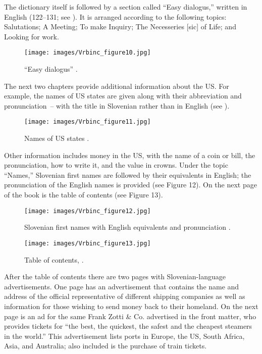 \documentclass[output=paper,colorlinks,citecolor=brown,arabicfont,chinesefont]{langscibook}
\begin{document}
The dictionary itself is followed by a section called “Easy dialogus,” written in English (122–131; see ). It is arranged according to the following topics: Salutations; A Meeting; To make Inquiry; The Necesseries [sic] of Life; and Looking for work.

\begin{figure}
\texttt{[image: images/Vrbinc\_figure10.jpg]}
\caption{“Easy dialogus” \citep[127]{Kubelka1904}.}
\label{vrbinc:fig10}
\end{figure}

The next two chapters provide additional information about the US. For example, the names of US states are given along with their abbreviation and pronunciation~-- with the title in Slovenian rather than in English (see ). 

\begin{figure}
\texttt{[image: images/Vrbinc\_figure11.jpg]}
\caption{Names of US states \citep[132]{Kubelka1904}.}
\label{vrbinc:fig11}
\end{figure}

Other information includes money in the US, with the name of a coin or bill, the pronunciation, how to write it, and the value in crowns. Under the topic “Names,” Slovenian first names are followed by their equivalents in English; the pronunciation of the English names is provided (see Figure 12). On the next page of the book is the table of contents (see Figure 13). 

\begin{figure}
\texttt{[image: images/Vrbinc\_figure12.jpg]}
\caption{Slovenian first names with English equivalents and pronunciation \citep[135]{Kubelka1904}.}
\label{Figure 12}
\end{figure}

\begin{figure}
\texttt{[image: images/Vrbinc\_figure13.jpg]}
\caption{Table of contents, \citep[136]{Kubelka1904}.}
\label{Figure 13}
\end{figure}

After the table of contents there are two pages with Slovenian-language advertisements. One page has an advertisement that contains the name and address of the official representative of different shipping companies as well as information for those wishing to send money back to their homeland. On the next page is an ad for the same Frank Zotti \& Co. advertised in the front matter, who provides tickets for “the best, the quickest, the safest and the cheapest steamers in the world.” This advertisement lists ports in Europe, the US, South Africa, Asia, and Australia; also included is the purchase of train tickets.
\end{document}
